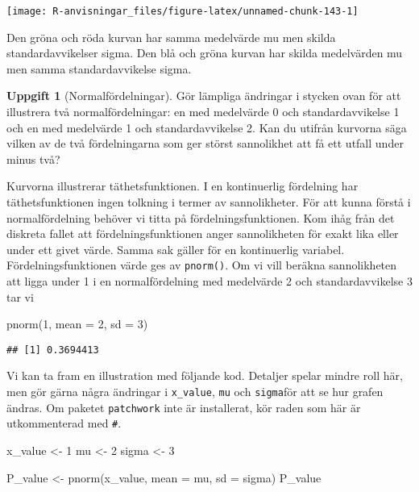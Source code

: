 \documentclass[
]{book}
\newenvironment{Shaded}{\begin{snugshade}}{\end{snugshade}}
\newcommand{\AttributeTok}[1]{\textcolor[rgb]{0.77,0.63,0.00}{#1}}
\newcommand{\DecValTok}[1]{\textcolor[rgb]{0.00,0.00,0.81}{#1}}
\newcommand{\FunctionTok}[1]{\textcolor[rgb]{0.00,0.00,0.00}{#1}}
\newcommand{\NormalTok}[1]{#1}
\newcommand{\OtherTok}[1]{\textcolor[rgb]{0.56,0.35,0.01}{#1}}
\theoremstyle{definition}
\theoremstyle{definition}
\theoremstyle{definition}
\newtheorem{exercise}{Uppgift}[chapter]
\theoremstyle{definition}
\theoremstyle{remark}
\begin{document}
\begin{center}\texttt{[image: R-anvisningar\_files/figure-latex/unnamed-chunk-143-1]} \end{center}

Den gröna och röda kurvan har samma medelvärde mu men skilda standardavvikelser sigma. Den blå och gröna kurvan har skilda medelvärden mu men samma standardavvikelse sigma.

\begin{exercise}[Normalfördelningar]
Gör lämpliga ändringar i stycken ovan för att illustrera två normalfördelningar: en med medelvärde 0 och standardavvikelse 1 och en med medelvärde 1 och standardavvikelse 2. Kan du utifrån kurvorna säga vilken av de två fördelningarna som ger störst sannolikhet att få ett utfall under minus två?
\end{exercise}

Kurvorna illustrerar täthetsfunktionen. I en kontinuerlig fördelning har täthetsfunktionen ingen tolkning i termer av sannolikheter. För att kunna förstå i normalfördelning behöver vi titta på fördelningsfunktionen. Kom ihåg från det diskreta fallet att fördelningsfunktionen anger sannolikheten för exakt lika eller under ett givet värde. Samma sak gäller för en kontinuerlig variabel. Fördelningsfunktionen värde ges av \texttt{pnorm()}. Om vi vill beräkna sannolikheten att ligga under 1 i en normalfördelning med medelvärde 2 och standardavvikelse 3 tar vi

\begin{Shaded}
\begin{Highlighting}[]
\FunctionTok{pnorm}\NormalTok{(}\DecValTok{1}\NormalTok{, }\AttributeTok{mean =} \DecValTok{2}\NormalTok{, }\AttributeTok{sd =} \DecValTok{3}\NormalTok{)}
\end{Highlighting}
\end{Shaded}

\begin{verbatim}
## [1] 0.3694413
\end{verbatim}

Vi kan ta fram en illustration med följande kod. Detaljer spelar mindre roll här, men gör gärna några ändringar i \texttt{x\_value}, \texttt{mu} och \texttt{sigma}för att se hur grafen ändras. Om paketet \texttt{patchwork} inte är installerat, kör raden som här är utkommenterad med \texttt{\#}.

\begin{Shaded}
\begin{Highlighting}[]
\NormalTok{x\_value }\OtherTok{\textless{}{-}} \DecValTok{1}
\NormalTok{mu }\OtherTok{\textless{}{-}} \DecValTok{2}
\NormalTok{sigma }\OtherTok{\textless{}{-}} \DecValTok{3}

\NormalTok{P\_value }\OtherTok{\textless{}{-}} \FunctionTok{pnorm}\NormalTok{(x\_value, }\AttributeTok{mean =}\NormalTok{ mu, }\AttributeTok{sd =}\NormalTok{ sigma)}
\NormalTok{P\_value}
\end{Highlighting}
\end{Shaded}
\end{document}
